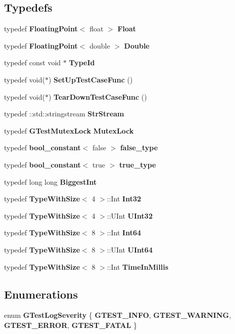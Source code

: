 \subsection*{Typedefs}
\begin{CompactItemize}
\item 
typedef {\bf FloatingPoint}$<$ float $>$ {\bf Float}
\item 
typedef {\bf FloatingPoint}$<$ double $>$ {\bf Double}
\item 
typedef const void $\ast$ {\bf TypeId}
\item 
typedef void($\ast$) {\bf SetUpTestCaseFunc} ()
\item 
typedef void($\ast$) {\bf TearDownTestCaseFunc} ()
\item 
typedef ::std::stringstream {\bf StrStream}
\item 
typedef {\bf GTestMutexLock} {\bf MutexLock}
\item 
typedef {\bf bool\_\-constant}$<$ false $>$ {\bf false\_\-type}
\item 
typedef {\bf bool\_\-constant}$<$ true $>$ {\bf true\_\-type}
\item 
typedef long long {\bf BiggestInt}
\item 
typedef {\bf TypeWithSize}$<$ 4 $>$::Int {\bf Int32}
\item 
typedef {\bf TypeWithSize}$<$ 4 $>$::UInt {\bf UInt32}
\item 
typedef {\bf TypeWithSize}$<$ 8 $>$::Int {\bf Int64}
\item 
typedef {\bf TypeWithSize}$<$ 8 $>$::UInt {\bf UInt64}
\item 
typedef {\bf TypeWithSize}$<$ 8 $>$::Int {\bf TimeInMillis}
\end{CompactItemize}
\subsection*{Enumerations}
\begin{CompactItemize}
\item 
enum {\bf GTestLogSeverity} \{ {\bf GTEST\_\-INFO}, 
{\bf GTEST\_\-WARNING}, 
{\bf GTEST\_\-ERROR}, 
{\bf GTEST\_\-FATAL}
 \}
\end{CompactItemize}
